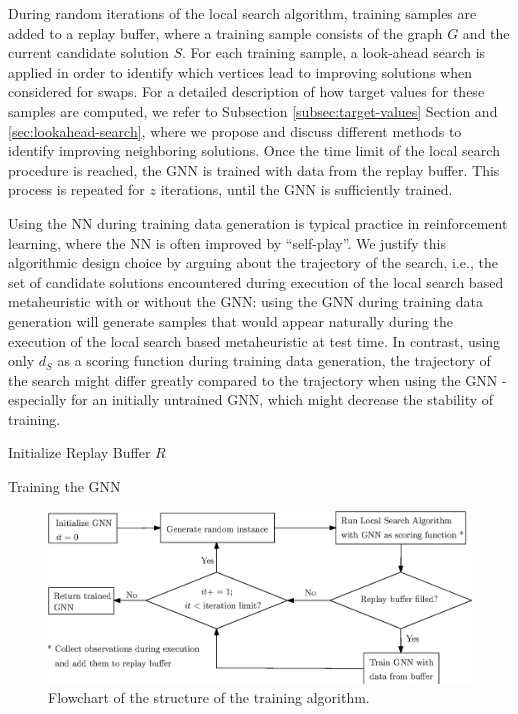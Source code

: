 \documentclass[draft,final]{vutinfth} %
\begin{document}
During random iterations of the local search algorithm, training samples are added to a replay buffer, where a training sample consists of the graph $G$ and the current candidate solution $S$. For each training sample, a look-ahead search is applied in order to identify which vertices lead to improving solutions when considered for swaps. For a detailed description of how target values for these samples are computed, we refer to Subsection \ref{subsec:target-values} Section and \ref{sec:lookahead-search}, where we propose and discuss different methods to identify improving neighboring solutions. 
Once the time limit of the local search procedure is reached, the GNN is trained with data from the replay buffer. 
This process is repeated for $z$ iterations, until the GNN is sufficiently trained. 

Using the NN during training data generation is typical practice in reinforcement learning, where the NN is often improved by ``self-play''. 
We justify this algorithmic design choice by arguing about the trajectory of the search, i.e., the set of candidate solutions encountered during execution of the local search based metaheuristic with or without the GNN: using the GNN during training data generation will generate samples that would appear naturally during the execution of the local search based metaheuristic at test time. In contrast, using only $d_S$ as a scoring function during training data generation, the trajectory of the search might differ greatly compared to the trajectory when using the GNN - especially for an initially untrained GNN, which might decrease the stability of training. 

\begin{algorithm}
    \DontPrintSemicolon
    Initialize Replay Buffer $R$ \;
    \caption{Training the GNN}
    \label{alg:training}
\end{algorithm}

\begin{figure}
    \centering
    \includegraphics[width=\textwidth]{graphics/flowchart_training_algorithm.eps}
    \caption{Flowchart of the structure of the training algorithm.}
    \label{fig:flowchart-training-algorithm}
\end{figure}
\end{document}
